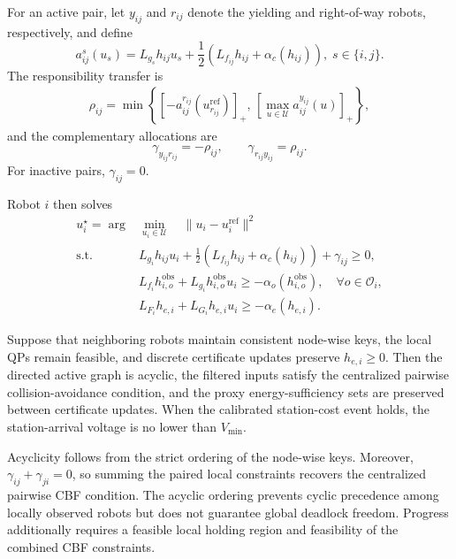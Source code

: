 For an active pair, let $y_{ij}$ and $r_{ij}$ denote the yielding and right-of-way robots, respectively, and define
\begin{equation}
    a_{ij}^{s}(u_s)=
    L_{g_s}h_{ij}u_s+
    \frac{1}{2}
    \left(
        L_{f_{ij}}h_{ij}
        +
        \alpha_c(h_{ij})
    \right),
    \; s\in\{i,j\}.
    \label{eq:local_pairwise_contribution}
\end{equation}
The responsibility transfer is
\begin{equation}
\begin{aligned}
    \rho_{ij}
    =
    \min\left\{
        \left[-a_{ij}^{r_{ij}}
        (u_{r_{ij}}^{\mathrm{ref}})\right]_+,\,
        \left[\max_{u\in\mathcal U}
        a_{ij}^{y_{ij}}(u)\right]_+
    \right\},
\end{aligned}
\label{eq:responsibility_transfer}
\end{equation}
and the complementary allocations are
\begin{equation}
    \gamma_{y_{ij}r_{ij}}=-\rho_{ij},
    \qquad
    \gamma_{r_{ij}y_{ij}}=\rho_{ij}.
    \label{eq:complementary_responsibility}
\end{equation}
For inactive pairs, $\gamma_{ij}=0$.

Robot $i$ then solves
\begin{equation}
\begin{aligned}
    u_i^\star
    =
    \arg&\min_{u_i\in\mathcal U}
    \quad
    \|u_i-u_i^{\mathrm{ref}}\|^2\\
    \mathrm{s.t.}\quad&
    L_{g_i}h_{ij}u_i
    +
    \frac{1}{2}
    \left(
        L_{f_{ij}}h_{ij}
        +
        \alpha_c(h_{ij})
    \right)
    +
    \gamma_{ij}
    \geq0,\\
    &
    L_{f_i}h_{i,o}^{\mathrm{obs}}
    +
    L_{g_i}h_{i,o}^{\mathrm{obs}}u_i
    \geq
    -\alpha_o(h_{i,o}^{\mathrm{obs}}),
    \quad \forall o\in\mathcal O_i,\\
    &
    L_{F_i}h_{e,i}
    +
    L_{G_i}h_{e,i}u_i
    \geq
    -\alpha_e(h_{e,i}).
    \label{eq:distributed_safety_filter}
\end{aligned}
\end{equation}

\begin{proposition}
Suppose that neighboring robots maintain consistent node-wise keys, the local QPs remain feasible, and discrete certificate updates preserve $h_{e,i}\geq0$.
Then the directed active graph is acyclic, the filtered inputs satisfy the centralized pairwise collision-avoidance condition, and the proxy energy-sufficiency sets are preserved between certificate updates.
When the calibrated station-cost event holds, the station-arrival voltage is no lower than $V_{\min}$.
\end{proposition}

Acyclicity follows from the strict ordering of the node-wise keys.
Moreover, $\gamma_{ij}+\gamma_{ji}=0$, so summing the paired local constraints recovers the centralized pairwise CBF condition.
The acyclic ordering prevents cyclic precedence among locally observed robots but does not guarantee global deadlock freedom.
Progress additionally requires a feasible local holding region and feasibility of the combined CBF constraints.
